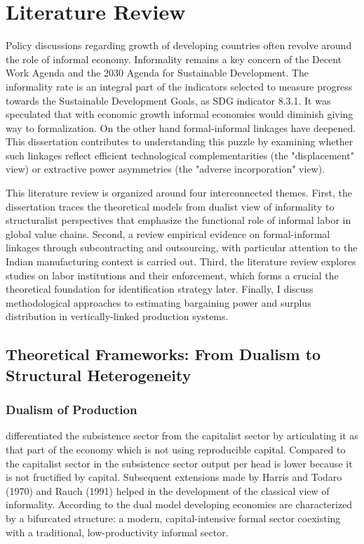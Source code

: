 \chapter{Literature Review}\label{chap:literature}

Policy discussions regarding growth of developing countries often revolve around the role of informal economy. Informality remains a key concern of the Decent Work Agenda and the 2030 Agenda for Sustainable Development. The informality rate is an integral part of the indicators selected to measure progress towards the Sustainable Development Goals, as SDG indicator 8.3.1. It was speculated that with economic growth informal economies would diminish giving way to formalization. On the other hand formal-informal linkages have deepened. This dissertation contributes to understanding this puzzle by examining whether such linkages reflect efficient technological complementarities (the "displacement" view) or extractive power asymmetries (the "adverse incorporation" view).

This literature review is organized around four interconnected themes. First, the dissertation traces the theoretical models from dualist view of informality to structuralist perspectives that emphasize the functional role of informal labor in global value chains. Second, a review empirical evidence on formal-informal linkages through subcontracting and outsourcing, with particular attention to the Indian manufacturing context is carried out. Third, the literature review explores studies on labor institutions and their enforcement, which forms a crucial the theoretical foundation for identification strategy later. Finally, I discuss methodological approaches to estimating bargaining power and surplus distribution in vertically-linked production systems.

\section{Theoretical Frameworks: From Dualism to Structural Heterogeneity}

\subsection{Dualism of Production}
\autocite{Lewis1954} differentiated the subsistence
sector from the capitalist sector by articulating it as that part of the economy which is not using reproducible capital. Compared to the capitalist sector in the subsistence sector output per head is lower because it is not fructified by capital.
Subsequent extensions made by Harris and Todaro (1970) and Rauch (1991) helped in the development of the classical view of informality. According to the dual model developing economies are characterized by a bifurcated structure: a modern, capital-intensive formal sector coexisting with a traditional, low-productivity informal sector. 

